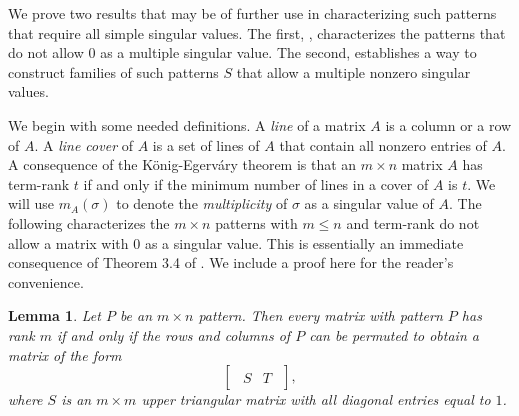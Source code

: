 \documentclass[preprint,12pt]{elsarticle}
\newtheorem{lemma}[theorem]{Lemma}
\begin{document}
We prove two results that may be of further use in characterizing such patterns that require all simple singular values.  The first, , 
characterizes the patterns that do not allow 
0 as a multiple singular value. The second,  establishes a way to construct families of such patterns $S$ that allow a multiple nonzero singular values. 

We begin with some needed definitions.
A \textit{line} of a matrix $A$ is a  column or a row of $A$. A \textit{line cover} of $A$ is a set of lines of $A$ that contain all nonzero entries of $A$. A consequence of the K\"onig-Egerv\'ary theorem is that an $m\times n$ matrix $A$ has term-rank $t$ if and only if 
the minimum number of lines in a cover of 
$A$ is $t$. We will use $m_A(\sigma)$ to denote the \textit{multiplicity} of $\sigma$ as a singular value of $A$. The following characterizes the  $m \times n$ patterns with $m\leq n$ and term-rank do not allow a matrix with $0$ as a singular value. This is essentially an immediate consequence of Theorem 3.4 of \cite{HershkowitzSchneider}.  We include a proof here for the reader's convenience. 
\begin{lemma}
\label{requireli}
Let $P$ be an $m\times n$ pattern. Then 
every matrix with pattern $P$ has rank  $m$ if and only 
if the rows and columns of $P$ can be permuted to obtain 
a matrix of the form 
\[ 
\begin{bmatrix}
\begin{array}{c|c}
S & T
\end{array}
\end{bmatrix},
\]
where $S$ is an $m\times m$ upper triangular matrix 
with all diagonal entries equal to $1$.
\end{lemma}
\end{document}
